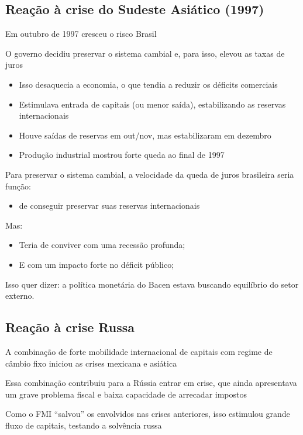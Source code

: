 \documentclass[a4paper,12pt]{article}[abntex2]
\begin{document}
\subsection{\textbf{Reação à crise do Sudeste Asiático (1997)}}

Em outubro de 1997 cresceu o risco Brasil

O governo decidiu preservar o sistema cambial e, para isso, elevou as taxas de juros\begin{itemize}
    \item Isso desaquecia a economia, o que tendia a reduzir os déficits comerciais
    \item Estimulava entrada de capitais (ou menor saída), estabilizando as reservas internacionais
    \item Houve saídas de reservas em out/nov, mas estabilizaram em dezembro
    \item Produção industrial mostrou forte queda ao final de 1997
\end{itemize}

Para preservar o sistema cambial, a velocidade da queda de juros brasileira seria função:\begin{itemize}
    \item de conseguir preservar suas reservas internacionais
\end{itemize}

Mas:\begin{itemize}
    \item Teria de conviver com uma recessão profunda;
    \item E com um impacto forte no déficit público;
\end{itemize}

Isso quer dizer: a política monetária do Bacen estava buscando equilíbrio do setor externo.

\subsection{\textbf{Reação à crise Russa}}
A combinação de forte mobilidade internacional de capitais com regime de câmbio fixo iniciou as crises mexicana e asiática

Essa combinação contribuiu para a Rússia entrar em crise, que ainda apresentava um grave problema fiscal e baixa capacidade de arrecadar impostos

Como o FMI “salvou” os envolvidos nas crises anteriores, isso estimulou grande fluxo de capitais, testando a solvência russa
\end{document}
